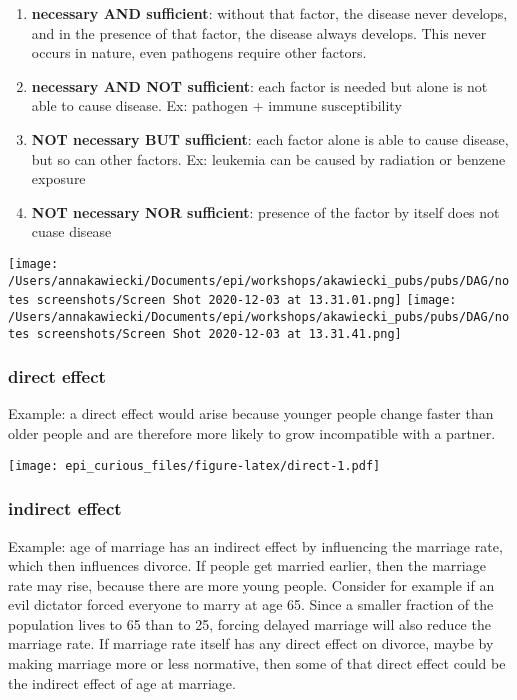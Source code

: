 \documentclass[
]{article}
\begin{document}
\begin{enumerate}
\def\labelenumi{\arabic{enumi}.}
\item
  \textbf{necessary AND sufficient}: without that factor, the disease
  never develops, and in the presence of that factor, the disease always
  develops. This never occurs in nature, even pathogens require other
  factors.
\item
  \textbf{necessary AND NOT sufficient}: each factor is needed but alone
  is not able to cause disease. Ex: pathogen + immune susceptibility
\item
  \textbf{NOT necessary BUT sufficient}: each factor alone is able to
  cause disease, but so can other factors. Ex: leukemia can be caused by
  radiation or benzene exposure
\item
  \textbf{NOT necessary NOR sufficient}: presence of the factor by
  itself does not cuase disease
\end{enumerate}

\texttt{[image: /Users/annakawiecki/Documents/epi/workshops/akawiecki\_pubs/pubs/DAG/notes screenshots/Screen Shot 2020-12-03 at 13.31.01.png]}
\texttt{[image: /Users/annakawiecki/Documents/epi/workshops/akawiecki\_pubs/pubs/DAG/notes screenshots/Screen Shot 2020-12-03 at 13.31.41.png]}

\hypertarget{direct-effect}{%
\subsubsection{direct effect}\label{direct-effect}}

Example: a direct effect would arise because younger people change
faster than older people and are therefore more likely to grow
incompatible with a partner.

\texttt{[image: epi\_curious\_files/figure-latex/direct-1.pdf]}

\hypertarget{indirect-effect}{%
\subsubsection{indirect effect}\label{indirect-effect}}

Example: age of marriage has an indirect effect by influencing the
marriage rate, which then influences divorce. If people get married
earlier, then the marriage rate may rise, because there are more young
people. Consider for example if an evil dictator forced everyone to
marry at age 65. Since a smaller fraction of the population lives to 65
than to 25, forcing delayed marriage will also reduce the marriage rate.
If marriage rate itself has any direct effect on divorce, maybe by
making marriage more or less normative, then some of that direct effect
could be the indirect effect of age at marriage.
\end{document}
